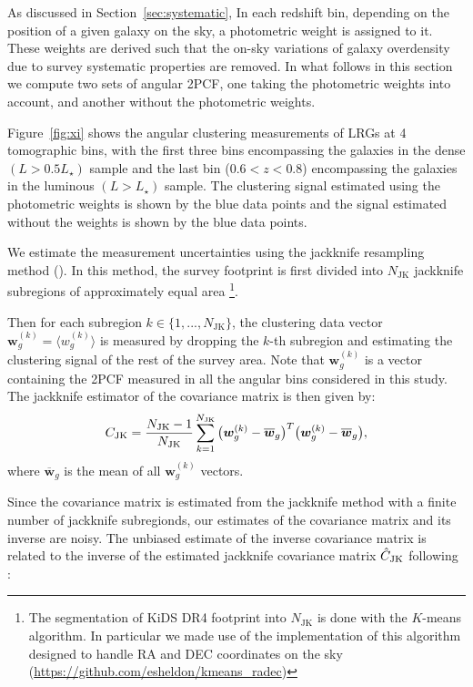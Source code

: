 \documentclass[fleqn,usenatbib,useAMS]{mnras}
\newcommand{\be}{\begin{equation}}
\newcommand{\ee}{\end{equation}}
\newcommand{\dk}{\boldsymbol{w}_{g}^{(k)}}
\newcommand{\dbar}{\overline{\boldsymbol{w}}_{g}}
\newcommand{\njk}{N_{\rm JK}}
\begin{document}
As discussed in Section~\ref{sec:systematic}, In each redshift bin, depending on the position of a given galaxy on the sky, a photometric weight is assigned to it. These weights are derived such that the on-sky variations of galaxy overdensity due to survey systematic properties are removed. In what follows in this section we compute two sets of angular 2PCF, one taking the photometric weights into account, and another without the photometric weights. 

Figure~\ref{fig:xi} shows the angular clustering measurements of LRGs at 4 tomographic bins, with the first three bins encompassing the galaxies in the dense $(L> 0.5L_{\star})$ sample and the last bin ($0.6<z<0.8$) encompassing the galaxies in the luminous $(L> L_{\star})$ sample. The clustering signal estimated using the photometric weights is shown by the blue data points and the signal estimated without the weights is shown by the blue data points. 

We estimate the measurement uncertainties using the jackknife resampling method (\citealt{norberg2009,oliver2016,singh2017,shirasaki2017}). 
In this method, the survey footprint is first divided into $N_{\mathrm{JK}}$ jackknife subregions of approximately equal area \footnote{The segmentation of KiDS DR4 footprint into $N_{\mathrm{JK}}$ is done with the $K$-means algorithm. In particular we made use of the implementation of this algorithm designed to handle RA and DEC coordinates on the sky (\hyperlink{kmeans\_radec}{https://github.com/esheldon/kmeans\_radec})}.

Then for each subregion $k\in\{1,...,N_{\mathrm{JK}}\}$, the clustering data vector $\boldsymbol{w}_{g}^{(k)} = \langle w^{(k)}_{g}\rangle$ is measured by dropping the $k$-th subregion and estimating the clustering signal of the rest of the survey area. Note that $\boldsymbol{w}_{g}^{(k)}$ is a vector containing the 2PCF measured in all the angular bins considered in this study. The jackknife estimator of the covariance matrix is then given by:
\be 
C_{\rm JK} = \frac{\njk - 1}{\njk}\sum_{k=1}^{\njk}\big(\dk-\dbar\big)^{T}\big(\dk-\dbar\big), 
\label{eq:jk}
\ee
where $\dbar$ is the mean of all $\boldsymbol{w}_{g}^{(k)}$ vectors. 

Since the covariance matrix is estimated from the jackknife method with a finite number of jackknife subregionds, our estimates of the covariance matrix and its inverse are noisy. The unbiased estimate of the inverse covariance matrix is related to the inverse of the estimated jackknife covariance matrix $\hat{C}_{\rm JK}$ following \citet{hartlap2007}:
\end{document}
